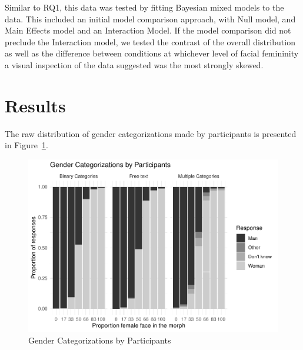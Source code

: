 \documentclass[
  man]{apa7}
\begin{document}
Similar to RQ1, this data was tested by fitting Bayesian mixed models to the data. This included an initial model comparison approach, with Null model, and Main Effects model and an Interaction Model. If the model comparison did not preclude the Interaction model, we tested the contrast of the overall distribution as well as the difference between conditions at whichever level of facial femininity a visual inspection of the data suggested was the most strongly skewed.

\hypertarget{results}{%
\section{Results}\label{results}}

The raw distribution of gender categorizations made by participants is presented in Figure~\ref{fig:descriptives}.

\begin{figure}
\centering
\includegraphics{resp_opts_manus23022_files/figure-latex/descriptives-1.pdf}
\caption{\label{fig:descriptives}Gender Categorizations by Participants}
\end{figure}
\end{document}
